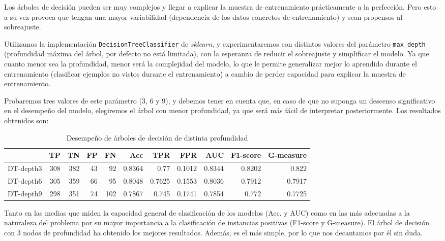 \documentclass{article}
\begin{document}
  Los árboles de decisión pueden ser muy complejos y llegar a explicar
  la muestra de entrenamiento prácticamente a la perfección. Pero esto
  a su vez provoca que tengan una mayor variabilidad (dependencia de
  los datos concretos de entrenamiento) y sean propensos al
  sobreajuste.

  Utilizamos la implementación \texttt{DecisionTreeClassifier} de
  \textit{sklearn}, y experimentaremos con distintos valores del
  parámetro \texttt{max\_depth} (profundidad máxima del árbol, por
  defecto no está limitada), con la esperanza de reducir el
  sobreajuste y simplificar el modelo. Ya que cuanto menor sea la
  profundidad, menor será la complejidad del modelo, lo que le permite
  generalizar mejor lo aprendido durante el entrenamiento (clasificar
  ejemplos no vistos durante el entrenamiento) a cambio de perder
  capacidad para explicar la muestra de entrenamiento.

  Probaremos tres valores de este parámetro (3, 6 y 9), y debemos
  tener en cuenta que, en caso de que no suponga un descenso
  significativo en el desempeño del modelo, elegiremos el árbol con
  menor profundidad, ya que será más fácil de interpretar
  posteriormente. Los resultados obtenidos son:

\begin{table}[H]
\centering
\caption{Desempeño de árboles de decisión de distinta profundidad}
\label{tab:dt-tuning}
\begin{tabular}{|lrrrrrrrrrr|}
\hline
 & TP & TN & FP & FN & Acc & TPR & FPR & AUC & F1-score & G-measure\\ \hline
DT-depth3 & 308 & 382 & 43 & 92 & 0.8364 & 0.77 & 0.1012 & 0.8344 & 0.8202 & 0.822\\
DT-depth6 & 305 & 359 & 66 & 95 & 0.8048 & 0.7625 & 0.1553 & 0.8036 & 0.7912 & 0.7917\\
DT-depth9 & 298 & 351 & 74 & 102 & 0.7867 & 0.745 & 0.1741 & 0.7854 & 0.772 & 0.7725\\
\hline
\end{tabular}
\end{table}

Tanto en las medias que miden la capacidad general de clasificación de
los modelos (Acc. y AUC) como en las más adecuadas a la naturaleza del
problema por su mayor importancia a la clasificación de instancias
positivas (F1-score y G-measure). El árbol de decisión con 3 nodos de
profundidad ha obtenido los mejores resultados. Además, es el más
simple, por lo que nos decantamos por él sin duda.
\end{document}

